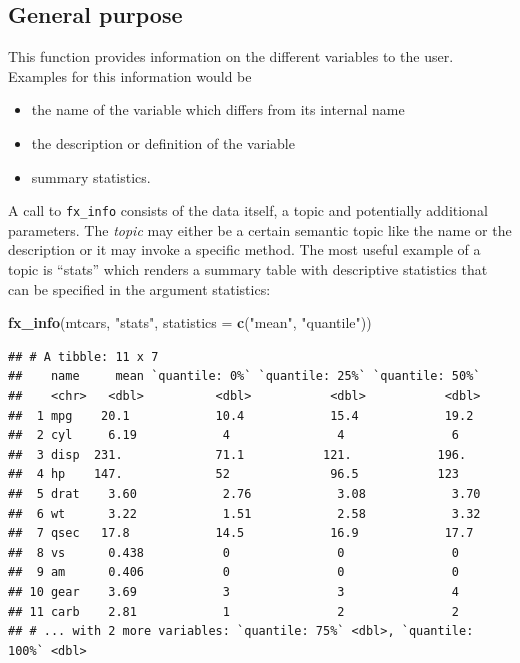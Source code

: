 \documentclass[]{report}
\newenvironment{Shaded}{\begin{snugshade}}{\end{snugshade}}
\newcommand{\KeywordTok}[1]{\textcolor[rgb]{0.13,0.29,0.53}{\textbf{#1}}}
\newcommand{\DataTypeTok}[1]{\textcolor[rgb]{0.13,0.29,0.53}{#1}}
\newcommand{\StringTok}[1]{\textcolor[rgb]{0.31,0.60,0.02}{#1}}
\newcommand{\NormalTok}[1]{#1}
\providecommand{\tightlist}{%
  \setlength{\itemsep}{0pt}\setlength{\parskip}{0pt}}
\theoremstyle{definition}
\theoremstyle{definition}
\theoremstyle{definition}
\theoremstyle{remark}
\begin{document}
\subsection{General purpose}\label{general-purpose-1}

This function provides information on the different variables to the
user. Examples for this information would be

\begin{itemize}
\tightlist
\item
  the name of the variable which differs from its internal name
\item
  the description or definition of the variable
\item
  summary statistics.
\end{itemize}

A call to \texttt{fx\_info} consists of the data itself, a topic and
potentially additional parameters. The \emph{topic} may either be a
certain semantic topic like the name or the description or it may invoke
a specific method. The most useful example of a topic is ``stats'' which
renders a summary table with descriptive statistics that can be
specified in the argument statistics:

\begin{Shaded}
\begin{Highlighting}[]
\KeywordTok{fx_info}\NormalTok{(mtcars, }\StringTok{"stats"}\NormalTok{, }\DataTypeTok{statistics =} \KeywordTok{c}\NormalTok{(}\StringTok{"mean"}\NormalTok{, }\StringTok{"quantile"}\NormalTok{))}
\end{Highlighting}
\end{Shaded}

\begin{verbatim}
## # A tibble: 11 x 7
##    name     mean `quantile: 0%` `quantile: 25%` `quantile: 50%`
##    <chr>   <dbl>          <dbl>           <dbl>           <dbl>
##  1 mpg    20.1            10.4            15.4            19.2 
##  2 cyl     6.19            4               4               6   
##  3 disp  231.             71.1           121.            196.  
##  4 hp    147.             52              96.5           123   
##  5 drat    3.60            2.76            3.08            3.70
##  6 wt      3.22            1.51            2.58            3.32
##  7 qsec   17.8            14.5            16.9            17.7 
##  8 vs      0.438           0               0               0   
##  9 am      0.406           0               0               0   
## 10 gear    3.69            3               3               4   
## 11 carb    2.81            1               2               2   
## # ... with 2 more variables: `quantile: 75%` <dbl>, `quantile: 100%` <dbl>
\end{verbatim}
\end{document}
